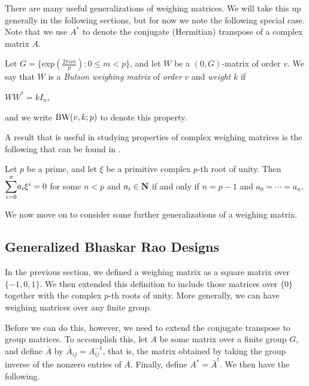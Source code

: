 \documentclass[../../../main]{subfiles}
\begin{document}
There are many useful generalizations of weighing matrices. We will take this up
generally in the following sections, but for now we note the following special
case. Note that we use $A^*$ to denote the conjugate (Hermitian) transpose of a complex matrix $A$.

\begin{defin}\label{butson-unitary}
  Let $G = \{\mathrm{exp}(\frac{2\pi im}{p}) : 0 \leq m < p\}$, and let $W$ be a
  $(0,G)$-matrix of order $v$. We say that $W$ is a {\it Butson weighing matrix}
  of {\it order} $v$ and {\it weight} $k$ if 
  \begin{defenum}
  \item $WW^* = kI_n$,
  \end{defenum}
  and we write $\text{BW}(v,k;p)$ to denote this property.
\end{defin}

A result that is useful in studying properties of complex weighing matrices is
the following that can be found in \cite{lam-leung}.

\begin{lem}\label{butson lemma}
  Let $p$ be a prime, and let $\xi$ be a primitive complex $p$-th root of unity.
  Then $\ssum_{i=0}^n a_i\xi^i = 0$ for some $n < p$ and $a_i \in \mathbf{N}$ if and
  only if $n = p-1$ and $a_0 = \cdots = a_n$. 
\end{lem}

We now move on to consider some further generalizations of a weighing matrix.

\dinkus


\subsection{Generalized Bhaskar Rao Designs}

In the previous section, we defined a weighing matrix as a square matrix over
$\{-1,0,1\}$. We then extended this definition to include those matrices over
$\{0\}$ together with the complex $p$-th roots of unity. More generally, we can
have weighing matrices over any finite group.  

Before we can do this, however, we need to extend the conjugate
transpose to group matrices. To accomplish this, let
$A$ be some matrix over a finite group $G$, and define $\bar A$ by
$\bar{A}_{ij}=A_{ij}^{-1}$, that is, the matrix obtained by taking the group
inverse of the nonzero entries of $A$. Finally, define $A^* = \bar{A}^t$. We
then have the following. 
\end{document}
